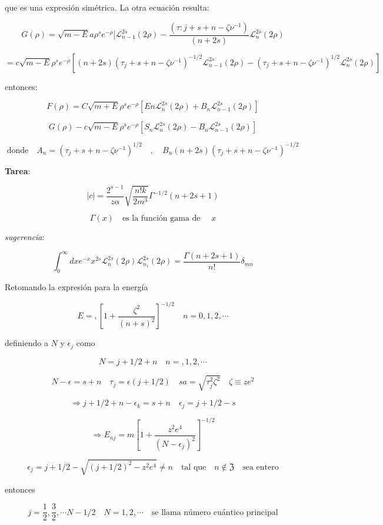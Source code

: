 \documentclass{report}
\begin{document}
que es una expresión simétrica. La otra ecuación resulta:

\[G(\rho) = \sqrt{m-E}a \rho^s e^{-\rho } [\mathscr{L}_{n-1}^{2s}(2\rho)- \frac{(\tau:j + s + n-\zeta \nu^{-1})}{(n+2s)} \mathscr{L}_{n}^{2s}(2\rho)\]

\[= c \sqrt{m-E} \rho^s e^{- \rho} [(n+2s)(\tau_{j}+s+n-\zeta \nu^{-1})^{-1/2} \mathscr{L}_{n-1}^{2s}(2\rho)- (\tau _j + s + n-\zeta \nu ^{-1})^{1/2} \mathscr{L}_{n}^{2s}(2\rho)]\]

entonces:

\[F(\rho )= C \sqrt{m + E} \rho^s e^{-\rho} [En \mathscr{L}_{n}^{2s}(2\rho) + B_n \mathscr{L}_{n-1}^{2s}(2\rho)]\]

\[G(\rho) -c \sqrt{m-E} \rho^s e^{-\rho } [S_n \mathscr{L}_{n}^{2s}(2\rho) - B_n \mathscr{L}_{n-1}^{2s}(2\rho)]\]

\[\text{donde} \quad A_n = (\tau _j +s+n-\zeta \nu^{-1})^{1/2} \quad , \quad B_n (n+2s)(\tau _j + s + n-\zeta \nu^{-1})^{-1/2}\]

\textbf{Tarea}:

\[|c| = \frac{2^{s-1}}{z \alpha} \sqrt{\frac{n!k}{2m^3}} \Gamma^{-1/2} (n+2s+1)\]

\[\Gamma(x) \quad \text{es la función gama de } \quad x \]

\textit{sugerencia}: 

\[\int _{0}^{\infty} dx e^{-x} x^{2s} \mathscr{L}_{n}^{2s}(2 \rho ) \mathscr{L}_{n_{1}}^{2s}(2 \rho ) = \frac{\Gamma(n+2s+1)}{n!} \delta_{mn}\]

Retomando la expresi\'on para la energ\'ia 

\[E = , [1+ \frac{\zeta ^2 }{(n+s)^2 }]^{-1/2} \quad n = 0,1,2, \cdots\]

definiendo a $N$ y $\epsilon_j $ como

\[N= j+1/2 + n \quad n = ,1,2, \cdots \]

\[N-\epsilon = s+n \quad \tau _j = \epsilon (j+1/2) \quad sa = \sqrt{\tau_{j}^{2} \zeta ^2 } \quad \zeta \equiv ze^2\]

\[\Rightarrow j + 1/2 + n - \epsilon_k = s+n \quad \epsilon _j = j +1/2 - s\]

\[\Rightarrow E_{nj} = m [1 + \frac{z^2 e^4 }{(N-\epsilon _j )^2 }]^{-1/2}\]

\[\epsilon_j = j +1/2 - \sqrt{(j+1/2)^2 - z^2 e^4} \neq n \quad \text{tal que} \quad n\notin \mathfrak{Z} \quad \text{sea entero}\]

entonces

\[j = \frac{1}{2}, \frac{3}{2} , \cdots N-1/2 \quad N=1,2, \cdots \quad \text{se llama número cuántico principal}\]
\end{document}
